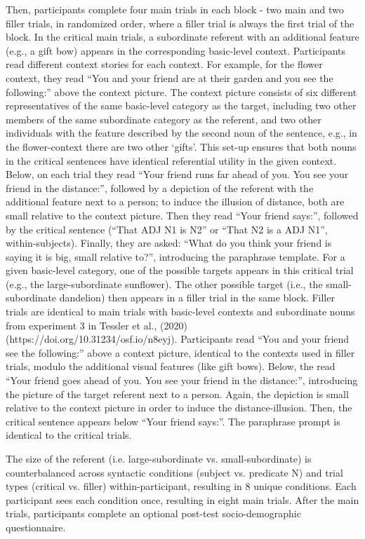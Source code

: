 \documentclass[a4paper,man,natbib]{apa6}
\begin{document}
Then, participants complete four main trials in each block - two main and two filler trials, in randomized order, where a filler trial is always the first trial of the block. In the critical main trials, a subordinate referent with an additional feature (e.g., a gift bow) appears in the corresponding basic-level context. Participants read different context stories for each context. For example, for the flower context, they read “You and your friend are at their garden and you see the following:” above the context picture. The context picture consists of six different representatives of the same basic-level category as the target, including two other members of the same subordinate category as the referent, and two other individuals with the feature described by the second noun of the sentence, e.g., in the flower-context there are two other ‘gifts’. This set-up ensures that both nouns in the critical sentences have identical referential utility in the given context.
Below, on each trial they read “Your friend runs far ahead of you. You see your friend in the distance:”, followed by a depiction of the referent with the additional feature next to a person; to induce the illusion of distance, both are small relative to the context picture. Then they read “Your friend says:”, followed by the critical sentence (“That ADJ N1 is N2” or “That N2 is a ADJ N1”, within-subjects). Finally, they are asked: “What do you think your friend is saying it is {big, small} relative to?”, introducing the paraphrase template. 
For a given basic-level category, one of the possible targets appears in this critical trial (e.g., the large-subordinate sunflower). The other possible target (i.e., the small-subordinate dandelion) then appears in a filler trial in the same block. 
Filler trials are identical to main trials with basic-level contexts and subordinate nouns from experiment 3 in Tessler et al., (2020) (https://doi.org/10.31234/osf.io/n8eyj). Participants read “You and your friend see the following:” above a context picture, identical to the contexts used in filler trials, modulo the additional visual features (like gift bows). Below, the read “Your friend goes ahead of you. You see your friend in the distance:”, introducing the picture of the target referent next to a person. Again, the depiction is small relative to the context picture in order to induce the distance-illusion. Then, the critical sentence appears below “Your friend says:”. The paraphrase prompt is identical to the critical trials. 

The size of the referent (i.e. large-subordinate vs. small-subordinate) is counterbalanced across syntactic conditions (subject vs. predicate N) and trial types (critical vs. filler) within-participant, resulting in 8 unique conditions. Each participant sees each condition once, resulting in eight main trials.
After the main trials, participants complete an optional post-test socio-demographic questionnaire. 
\end{document}
